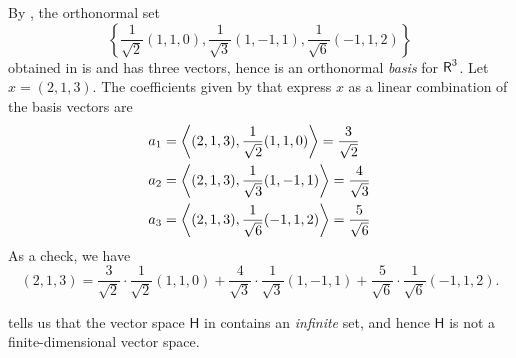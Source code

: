 \begin{example} \label{example 6.2.3}
By , the orthonormal set
\[
     \left\{ \frac{1}{\sqrt{2}}(1, 1, 0), \frac{1}{\sqrt{3}}(1, -1, 1), \frac{1}{\sqrt{6}}(-1, 1, 2) \right\}
\]
obtained in  is \LID{} and has three vectors, hence is an orthonormal \emph{basis} for \(\textsf{R}^3\).
Let \(x = (2, 1, 3)\).
The coefficients given by  that express \(x\) as a linear combination of the basis vectors are
\begin{align*}
    a_1 & = \left< (2, 1, 3), \frac{1}{\sqrt{2}}(1, 1, 0) \right> = \frac{3}{\sqrt{2}}\\
    a_2 & = \left< (2, 1, 3), \frac{1}{\sqrt{3}}(1, -1, 1) \right> = \frac{4}{\sqrt{3}} \\
    a_3 & = \left< (2, 1, 3), \frac{1}{\sqrt{6}}(-1, 1, 2) \right> = \frac{5}{\sqrt{6}}
\end{align*}
As a check, we have
\[
    (2, 1, 3) = \frac{3}{\sqrt{2}} \cdot \frac{1}{\sqrt{2}}(1, 1, 0) + \frac{4}{\sqrt{3}} \cdot \frac{1}{\sqrt{3}}(1, -1, 1) + \frac{5}{\sqrt{6}} \cdot \frac{1}{\sqrt{6}}(-1, 1, 2).
\]
\end{example}

\begin{remark} \label{remark 6.2.1}
 tells us that the vector space \(\textsf{H}\) in  contains an \emph{infinite} \LID{} set, and hence \(\textsf{H}\) is not a finite-dimensional vector space.
\end{remark}

